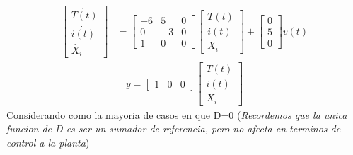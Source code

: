 \documentclass[
  11pt,
  letterpaper,
   addpoints,
   answers
  ]{exam}
\begin{document}
\begin{questions}
\begin{solution}
\begin{align}
    \begin{bmatrix}
        \dot{T(t)}\\
        \dot{i(t)}\\
        \dot{X_{i}}
    \end{bmatrix}
    &=
    \begin{bmatrix}
        -6 & 5 & 0\\
        0 & -3 & 0\\
        1 & 0 & 0
    \end{bmatrix}
    \begin{bmatrix}
        T(t)\\
        i(t)\\
        X_{i}
    \end{bmatrix}
    +
    \begin{bmatrix}
        0\\
        5\\
        0
    \end{bmatrix}
    v(t)
\end{align}
\begin{align}
    y=
    \begin{bmatrix}
        1 & 0 & 0
    \end{bmatrix}
    \begin{bmatrix}
        T(t)\\
        i(t)\\
        X_{i}
    \end{bmatrix}
\end{align}
Considerando como la mayoria de casos en que D=0 (\textit{Recordemos que la unica funcion de D es ser un sumador de referencia, pero no afecta en terminos de control a la planta})

\end{solution}
\end{questions}
\end{document}
